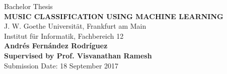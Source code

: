 \documentclass[12pt]{report}
\begin{document}
\pagestyle{fancy}



\begin{titlepage}
    \vspace{0cm}
    \hspace*{-120pt}
    {
    }
    \vspace{1.4cm}
  {\begin{center}
      {\LARGE Bachelor Thesis\\[2.8cm]}
      {\LARGE \textbf{MUSIC CLASSIFICATION USING MACHINE LEARNING}\\[0.7cm]}
      {\Large J. W. Goethe Universit\"at, Frankfurt am Main\\[0cm]}
      {\Large Institut f\"ur Informatik, Fachbereich 12\\[2.8cm]}
      {\LARGE \textbf{Andr\'es Fern\'andez Rodr\'iguez}\\[0.7cm]}
      {\large \textbf{Supervised by Prof. Visvanathan Ramesh}\\[2.8cm]}
      {\large Submission Date: 18 September 2017}\\
    \end{center}
  }
\end{titlepage}
\end{document}
